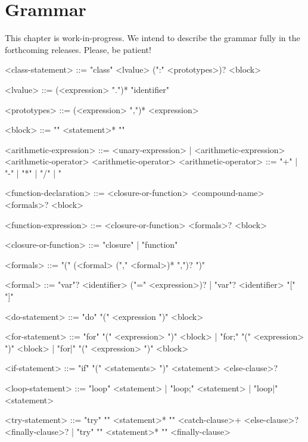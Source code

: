 
\chapter{Grammar}
\label{sec:grammar}

This chapter is work-in-progress.  We intend to describe the grammar fully
in the forthcoming releases.  Please, be patient!

\begin{bnf}
<class-statement>
  ::= "class" <lvalue> (":" <prototypes>)? <block>

<lvalue>
  ::= (<expression> ".")* "identifier"

<prototypes>
  ::= (<expression> ",")* <expression>

<block>
  ::= "{" <statement>* "}"


<arithmetic-expression>
   ::= <unary-expression>
     | <arithmetic-expression> <arithmetic-operator> <arithmetic-operator>
<arithmetic-operator> ::= "+" | "-" | "*" | "/" | "%


<function-declaration>
  ::= <closure-or-function> <compound-name> <formals>? <block>

<function-expression>
  ::= <closure-or-function> <formals>? <block>

<closure-or-function> ::= "closure" | "function"

<formals> ::= "(" (<formal> ("," <formal>)* ",")? ")"

<formal> ::= "var"? <identifier> ("=" <expression>)?
           | "var"? <identifier> "[" "]"


<do-statement> ::= "do" "(" <expression ")" <block>


<for-statement>
   ::= "for" "(" <expression> ")" <block>
     | "for;" "(" <expression> ")" <block>
     | "for|" "(" <expression> ")" <block>


<if-statement>
  ::= "if" "(" <statements> ")" <statement> <else-clause>?

<loop-statement>
  ::= "loop" <statement>
    | "loop;" <statement>
    | "loop|" <statement>


<try-statement>
  ::= "try" "{" <statement>* "}" <catch-clause>+ <else-clause>? <finally-clause>?
    | "try" "{" <statement>* "}" <finally-clause>


\end{bnf}

